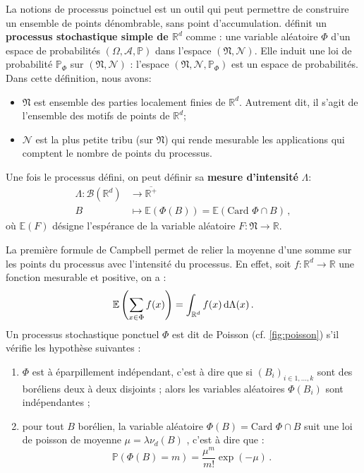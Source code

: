 \noindent La notions de processus poinctuel est un outil qui peut permettre de construire un ensemble de points dénombrable, sans point d'accumulation. \citeauthor{balasoiu2020halthesis} définit un \textbf{processus stochastique simple de $\mathbb{R}^d$} comme : une variable aléatoire $\Phi$ d’un espace de probabilités $(\Omega, \mathcal{A}, \mathbb{P})$ dans l’espace $(\mathfrak{N}, \mathcal{N})$. Elle induit une loi de probabilité $\mathbb{P}_\Phi$ sur $(\mathfrak{N}, \mathcal{N})$ : l’espace $(\mathfrak{N}, \mathcal{N}, \mathbb{P}_\Phi)$ est un espace de probabilités. Dans cette définition, nous avons:  
\begin{itemize}
    \item $\mathfrak{N}$ est ensemble des parties localement finies de $\mathbb{R}^d$. Autrement dit, il s'agit de l'ensemble des motifs de points de $\mathbb{R}^d$;
    \item $\mathcal{N}$ est la plus petite tribu (sur $\mathfrak{N}$) qui rende mesurable les applications qui comptent le nombre de points du processus. 
\end{itemize}
Une fois le processus défini, on peut définir sa \textbf{mesure d'intensité} $\Lambda$:
\begin{align*}    
    \Lambda : \mathcal{B}(\mathbb{R}^d) &\rightarrow \overline{\mathbb{R}^+} \\
    B & \mapsto \mathbb{E}(\Phi(B)) = \mathbb{E}(\text{Card } \Phi \cap B) \,,
\end{align*}
où $\mathbb{E}(F)$ désigne l'espérance de la variable aléatoire $F:\mathfrak{N}\rightarrow \mathbb{R}$.

\noindent La première formule de Campbell permet de relier la moyenne d’une somme sur les points du processus avec l’intensité du processus. En effet, soit $f:\mathbb{R}^d \rightarrow \mathbb{R}$ une fonction mesurable et positive, on a :
$$
\mathbb{E} \left( \sum_{x \in \Phi} f(x) \right) = \int_{\mathbb{R}^d} f(x) \diff \Lambda(x) \,.
$$
Un processus stochastique ponctuel $\Phi$ est dit de Poisson (cf. \cref{fig:poisson}) s'il vérifie les hypothèse suivantes
: 
\begin{enumerate}
    \item $\Phi$ est à éparpillement indépendant, c’est à dire que si $(B_i)_{i \in {1,...,k}}$ sont des boréliens deux à deux disjoints ; alors les variables aléatoires $\Phi(B_i)$ sont indépendantes ;
    \item pour tout $B$ borélien, la variable aléatoire $\Phi(B) = \text{Card } \Phi \cap B$ suit une loi de poisson de moyenne $\mu =  \lambda \nu_d(B)$ , c’est à dire que :
    \[
    \mathbb{P}(\Phi (B) = m) = \frac{\mu^m}{m!}\exp(-\mu) \,.
    \]
\end{enumerate}

